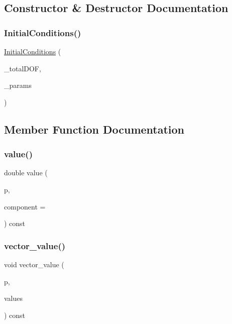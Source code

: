 \subsection{Constructor \& Destructor Documentation}
\mbox{\label{class_initial_conditions_a86f1233a3d8103059d1a499e1e1d9c04}} 
\subsubsection{\texorpdfstring{InitialConditions()}{InitialConditions()}}
{\footnotesize\ttfamily \mbox{\hyperlink{class_initial_conditions}{Initial\+Conditions}} (\begin{DoxyParamCaption}\item[{int}]{\+\_\+total\+D\+OF,  }\item[{Parameter\+Handler \&}]{\+\_\+params }\end{DoxyParamCaption})}



\subsection{Member Function Documentation}
\mbox{\label{class_initial_conditions_a369cea7ba74f8cd0a6ca12e0c164ff74}} 
\subsubsection{\texorpdfstring{value()}{value()}}
{\footnotesize\ttfamily double value (\begin{DoxyParamCaption}\item[{const Point$<$ dim $>$ \&}]{p,  }\item[{const unsigned int}]{component = {} }\end{DoxyParamCaption}) const\hspace{0.3cm}{\ttfamily [virtual]}}

\mbox{\label{class_initial_conditions_aa10cfdd7350c3810a8deab707f397657}} 
\subsubsection{\texorpdfstring{vector\_value()}{vector\_value()}}
{\footnotesize\ttfamily void vector\+\_\+value (\begin{DoxyParamCaption}\item[{const Point$<$ dim $>$ \&}]{p,  }\item[{Vector$<$ double $>$ \&}]{values }\end{DoxyParamCaption}) const\hspace{0.3cm}{\ttfamily [virtual]}}




